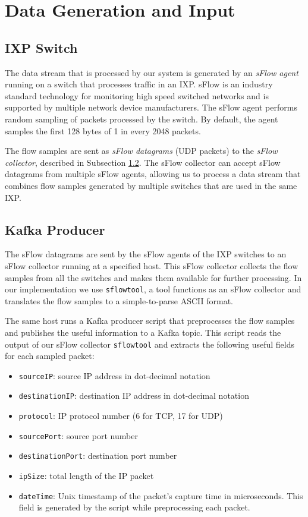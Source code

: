 \section{Data Generation and Input}

\subsection{IXP Switch}

The data stream that is processed by our system is generated by an \emph{sFlow agent} running on a switch that processes traffic in an IXP. sFlow is an industry standard technology for monitoring high speed switched networks and is supported by multiple network device manufacturers. The sFlow agent performs random sampling of packets processed by the switch. By default, the agent samples the first 128 bytes of 1 in every 2048 packets.

The flow samples are sent as \emph{sFlow datagrams} (UDP packets) to the \emph{sFlow collector}, described in Subsection \ref{subsection:system_kafka_producer}. The sFlow collector can accept sFlow datagrams from multiple sFlow agents, allowing us to process a data stream that combines flow samples generated by multiple switches that are used in the same IXP.

\subsection{Kafka Producer}\label{subsection:system_kafka_producer}

The sFlow datagrams are sent by the sFlow agents of the IXP switches to an sFlow collector running at a specified host. This sFlow collector collects the flow samples from all the switches and makes them available for further processing. In our implementation we use \texttt{sflowtool}, a tool functions as an sFlow collector and translates the flow samples to a simple-to-parse ASCII format.

The same host runs a Kafka producer script that preprocesses the flow samples and publishes the useful information to a Kafka topic. This script reads the output of our sFlow collector \texttt{sflowtool} and extracts the following useful fields for each sampled packet:
\begin{itemize}
\item \texttt{sourceIP}: source IP address in dot-decimal notation
\item \texttt{destinationIP}: destination IP address in dot-decimal notation
\item \texttt{protocol}: IP protocol number (6 for TCP, 17 for UDP)
\item \texttt{sourcePort}: source port number
\item \texttt{destinationPort}: destination port number
\item \texttt{ipSize}: total length of the IP packet
\item \texttt{dateTime}: Unix timestamp of the packet's capture time in microseconds. This field is generated by the script while preprocessing each packet. 
\end{itemize}

